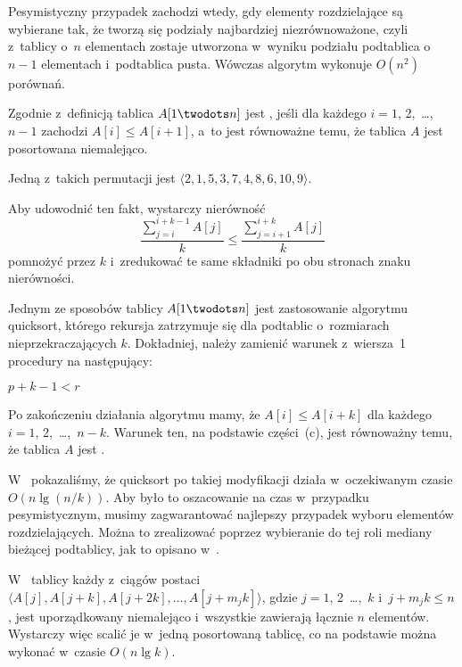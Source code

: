 Pesymistyczny przypadek zachodzi wtedy, gdy elementy rozdzielające są wybierane tak, że tworzą się podziały najbardziej niezrównoważone, czyli z~tablicy o~$n$ elementach zostaje utworzona w~wyniku podziału podtablica o~$n-1$ elementach i~podtablica pusta. Wówczas algorytm wykonuje $O(n^2)$ porównań.


\subproblem %
Zgodnie z~definicją tablica $A[1\twodots n]$ jest , jeśli dla każdego $i=1$, 2,~\dots,~$n-1$ zachodzi $A[i]\le A[i+1]$, a~to jest równoważne temu, że tablica $A$ jest posortowana niemalejąco.

\subproblem %
Jedną z~takich permutacji jest $\langle2,1,5,3,7,4,8,6,10,9\rangle$.

\subproblem %
Aby udowodnić ten fakt, wystarczy nierówność
\[
	\frac{\sum_{j=i}^{i+k-1}A[j]}{k} \le \frac{\sum_{j=i+1}^{i+k}A[j]}{k}
\]
pomnożyć przez $k$ i~zredukować te same składniki po obu stronach znaku nierówności.

\subproblem %
Jednym ze sposobów  tablicy $A[1\twodots n]$ jest zastosowanie algorytmu quicksort, którego rekursja zatrzymuje się dla podtablic o~rozmiarach nieprzekraczających $k$. Dokładniej, należy zamienić warunek z~wiersza~1 procedury  na następujący:
\begin{codebox}
\li	\If $p+k-1<r$
\end{codebox}
Po zakończeniu działania algorytmu mamy, że $A[i]\le A[i+k]$ dla każdego $i=1$, 2,~\dots,~$n-k$. Warunek ten, na podstawie części~(c), jest równoważny temu, że tablica $A$ jest .

W~ pokazaliśmy, że quicksort po takiej modyfikacji działa w~oczekiwanym czasie $O(n\lg(n/k))$. Aby było to oszacowanie na czas w~przypadku pesymistycznym, musimy zagwarantować najlepszy przypadek wyboru elementów rozdzielających. Można to zrealizować poprzez wybieranie do tej roli mediany bieżącej podtablicy, jak to opisano w~.

\subproblem %
W~ tablicy każdy z~ciągów postaci $\langle A[j],A[j+k],A[j+2k],\dots,A[j+m_jk]\rangle$, gdzie $j=1$, 2~\dots,~$k$ i~$j+m_jk\le n$, jest uporządkowany niemalejąco i~wszystkie zawierają łącznie $n$ elementów. Wystarczy więc scalić je w~jedną posortowaną tablicę, co na podstawie  można wykonać w~czasie $O(n\lg k)$.

